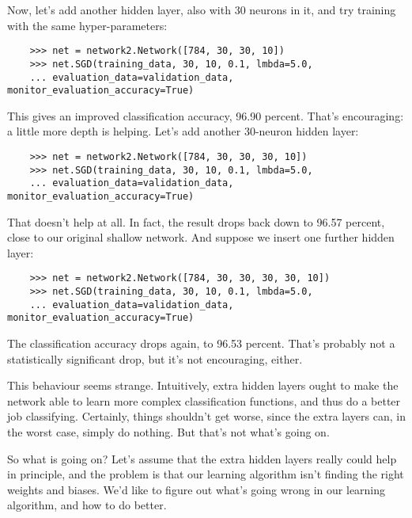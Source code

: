 Now, let's add another hidden layer, also with 30 neurons in it, and try training with the same hyper-parameters:
\begin{lstlisting}
    >>> net = network2.Network([784, 30, 30, 10])
    >>> net.SGD(training_data, 30, 10, 0.1, lmbda=5.0, 
    ... evaluation_data=validation_data, monitor_evaluation_accuracy=True)
\end{lstlisting}
This gives an improved classification accuracy, 96.90 percent. That's encouraging: a little more depth is helping. Let's add another 30-neuron hidden layer:
\begin{lstlisting}
    >>> net = network2.Network([784, 30, 30, 30, 10])
    >>> net.SGD(training_data, 30, 10, 0.1, lmbda=5.0, 
    ... evaluation_data=validation_data, monitor_evaluation_accuracy=True)
\end{lstlisting}
That doesn't help at all. In fact, the result drops back down to 96.57 percent, close to our original shallow network. And suppose we insert one further hidden layer:
\begin{lstlisting}
    >>> net = network2.Network([784, 30, 30, 30, 30, 10])
    >>> net.SGD(training_data, 30, 10, 0.1, lmbda=5.0, 
    ... evaluation_data=validation_data, monitor_evaluation_accuracy=True)
\end{lstlisting}
The classification accuracy drops again, to 96.53 percent. That's probably not a statistically significant drop, but it's not encouraging, either.

This behaviour seems strange. Intuitively, extra hidden layers ought to make the network able to learn more complex classification functions, and thus do a better job classifying. Certainly, things shouldn't get worse, since the extra layers can, in the worst case, simply do nothing. But that's not what's going on.

So what is going on? Let's assume that the extra hidden layers really could help in principle, and the problem is that our learning algorithm isn't finding the right weights and biases. We'd like to figure out what's going wrong in our learning algorithm, and how to do better.

